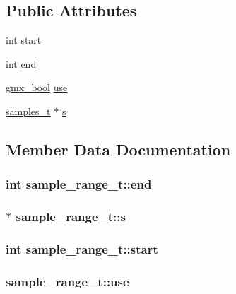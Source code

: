 \subsection*{\-Public \-Attributes}
\begin{DoxyCompactItemize}
\item 
int \hyperlink{structsample__range__t_a5b368e7dfe02f1775e5d9cdf48298d3f}{start}
\item 
int \hyperlink{structsample__range__t_a5dd0aac3755130b354241528b971c818}{end}
\item 
\hyperlink{include_2types_2simple_8h_a8fddad319f226e856400d190198d5151}{gmx\-\_\-bool} \hyperlink{structsample__range__t_a83d20d1b45b70504085b6b16d532480e}{use}
\item 
\hyperlink{structsamples__t}{samples\-\_\-t} $\ast$ \hyperlink{structsample__range__t_a30d79eaa46de3d882d478b1c27ffced5}{s}
\end{DoxyCompactItemize}


\subsection{\-Member \-Data \-Documentation}
\hypertarget{structsample__range__t_a5dd0aac3755130b354241528b971c818}{
\subsubsection[{end}]{\setlength{\rightskip}{0pt plus 5cm}int {\bf sample\-\_\-range\-\_\-t\-::end}}}\label{structsample__range__t_a5dd0aac3755130b354241528b971c818}
\hypertarget{structsample__range__t_a30d79eaa46de3d882d478b1c27ffced5}{
\subsubsection[{s}]{$\ast$ {\bf sample\-\_\-range\-\_\-t\-::s}}}\label{structsample__range__t_a30d79eaa46de3d882d478b1c27ffced5}
\hypertarget{structsample__range__t_a5b368e7dfe02f1775e5d9cdf48298d3f}{
\subsubsection[{start}]{\setlength{\rightskip}{0pt plus 5cm}int {\bf sample\-\_\-range\-\_\-t\-::start}}}\label{structsample__range__t_a5b368e7dfe02f1775e5d9cdf48298d3f}
\hypertarget{structsample__range__t_a83d20d1b45b70504085b6b16d532480e}{
\subsubsection[{use}]{ {\bf sample\-\_\-range\-\_\-t\-::use}}}\label{structsample__range__t_a83d20d1b45b70504085b6b16d532480e}


